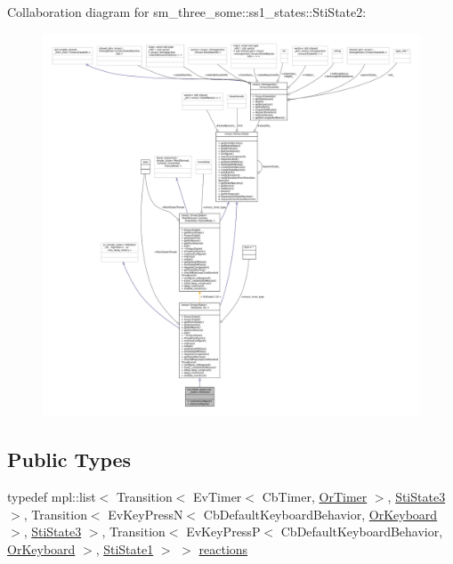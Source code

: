 Collaboration diagram for sm\+\_\+three\+\_\+some\+:\+:ss1\+\_\+states\+:\+:Sti\+State2\+:
\nopagebreak
\begin{figure}[H]
\begin{center}
\leavevmode
\includegraphics[width=350pt]{structsm__three__some_1_1ss1__states_1_1StiState2__coll__graph}
\end{center}
\end{figure}
\subsection*{Public Types}
\begin{DoxyCompactItemize}
\item 
typedef mpl\+::list$<$ Transition$<$ Ev\+Timer$<$ Cb\+Timer, \hyperlink{classsm__three__some_1_1OrTimer}{Or\+Timer} $>$, \hyperlink{structsm__three__some_1_1ss1__states_1_1StiState3}{Sti\+State3} $>$, Transition$<$ Ev\+Key\+PressN$<$ Cb\+Default\+Keyboard\+Behavior, \hyperlink{classsm__three__some_1_1OrKeyboard}{Or\+Keyboard} $>$, \hyperlink{structsm__three__some_1_1ss1__states_1_1StiState3}{Sti\+State3} $>$, Transition$<$ Ev\+Key\+PressP$<$ Cb\+Default\+Keyboard\+Behavior, \hyperlink{classsm__three__some_1_1OrKeyboard}{Or\+Keyboard} $>$, \hyperlink{structsm__three__some_1_1ss1__states_1_1StiState1}{Sti\+State1} $>$ $>$ \hyperlink{structsm__three__some_1_1ss1__states_1_1StiState2_a3a6dd1b1f9cf7033bbb6e0c6bbc76f5c}{reactions}
\end{DoxyCompactItemize}
